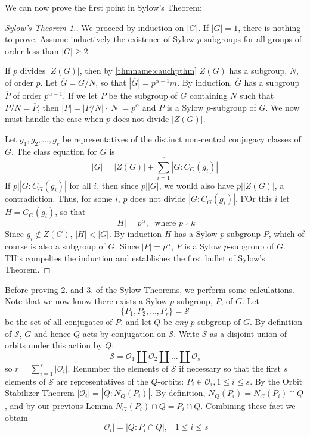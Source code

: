 \documentclass[12pt, a4paper, oneside, openright, titlepage]{book}
\begin{document}
We can now prove the first point in Sylow's Theorem:

\begin{proof}[Sylow's Theorem 1.]
    We proceed by induction on $|G|$. If $|G| = 1$, there is nothing to prove. Assume inductively the existence of Sylow $p$-subgroups for all groups of order less than $|G| \geq 2$.

    If $p$ divides $|Z(G)|$, then by \ref{thmname:cauchpthm} $Z(G)$ has a subgroup, $N$, of order $p$. Let $\overline{G} = G/N$, so that $|\overline{G}| = p^{\alpha-1}m$. By induction, $\overline{G}$ has a subgroup $\overline{P}$ of order $p^{\alpha-1}$. If we let $P$ be the subgroup of $G$ containing $N$ such that $P/N =\overline{P}$, then $|P| = |P/N|\cdot|N| = p^{\alpha}$ and $P$ is a Sylow $p$-subgroup of $G$. We now must handle the case when $p$ does not divide $|Z(G)|$.

    Let $g_1,g_2,...,g_r$ be representatives of the distinct non-central conjugacy classes of $G$. The class equation for $G$ is \begin{equation*}
        |G| = |Z(G)| + \sum\limits_{i=1}^r|G:C_G(g_i)|
    \end{equation*}
    If $p\vert |G:C_G(g_i)|$ for all $i$, then since $p\vert |G|$, we would also have $p\vert|Z(G)|$, a contradiction. Thus, for some $i$, $p$ does not divide $|G:C_G(g_i)|$. FOr this $i$ let $H = C_G(g_i)$, so that \begin{equation*}
        |H| = p^{\alpha}, \;\text{ where }p\nmid k
    \end{equation*}
    Since $g_i \notin Z(G)$, $|H| < |G|$. By induction $H$ has a Sylow $p$-subgroup $P$, which of course is also a subgroup of $G$. Since $|P| = p^{\alpha}$, $P$ is a Sylow $p$-subgroup of $G$. THis compeltes the induction and establishes the first bullet of Sylow's Theorem.
\end{proof}

Before proving $2.$ and $3.$ of the Sylow Theorems, we perform some calculations. Note that we now know there exists a Sylow $p$-subgroup, $P$, of $G$. Let \begin{equation*}
    \{P_1,P_2,...,P_r\} = \mathcal{S}
\end{equation*}
be the set of all conjugates of $P$, and let $Q$ be \emph{any} $p$-subgroup of $G$. By definition of $\mathcal{S}$, $G$ and hence $Q$ acts by conjugation on $\mathcal{S}$. Write $\mathcal{S}$ as a disjoint union of orbits under this action by $Q$: \begin{equation*}
    \mathcal{S} = \mathcal{O}_1\coprod\mathcal{O}_2\coprod...\coprod\mathcal{O}_s
\end{equation*}
so $r = \sum_{i=1}^s|\mathcal{O}_i|$. Renumber the elements of $\mathcal{S}$ if necessary so that the first $s$ elements of $\mathcal{S}$ are representatives of the $Q$-orbits: $P_i\in\mathcal{O}_i, 1\leq i \leq s$. By the Orbit Stabilizer Theorem $|\mathcal{O}_i| = |Q:N_Q(P_i)|$. By definition, $N_Q(P_i) = N_G(P_i)\cap Q$, and by our previous Lemma $N_G(P_i)\cap Q = P_i\cap Q$. Combining these fact we obtain \begin{equation*}
    |\mathcal{O}_i| = |Q:P_i\cap Q|,\;\;\; 1 \leq i \leq s
\end{equation*}
\end{document}
